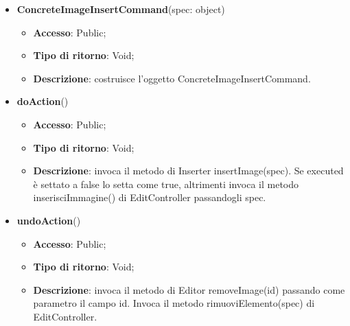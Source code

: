 {{{	
	\begin{itemize}
		\item \textbf{ConcreteImageInsertCommand}(spec: object)
		\begin{itemize}
			\item \textbf{Accesso}: Public;
			\item \textbf{Tipo di ritorno}: Void;
			\item \textbf{Descrizione}: costruisce l’oggetto ConcreteImageInsertCommand.
		\end{itemize}
		\item \textbf{doAction}()
		\begin{itemize}
			\item \textbf{Accesso}: Public;
			\item \textbf{Tipo di ritorno}: Void;
			\item \textbf{Descrizione}: invoca il metodo di Inserter insertImage(spec). Se executed è settato a false lo setta come true, altrimenti invoca il metodo inserisciImmagine() di EditController passandogli spec.
		\end{itemize}
		\item \textbf{undoAction}()
		\begin{itemize}
			\item \textbf{Accesso}: Public;
			\item \textbf{Tipo di ritorno}: Void;
			\item \textbf{Descrizione}: invoca il metodo di Editor removeImage(id) passando come parametro il campo id. Invoca il metodo rimuoviElemento(spec) di EditController.
		\end{itemize}
	\end{itemize}
	}

}}
